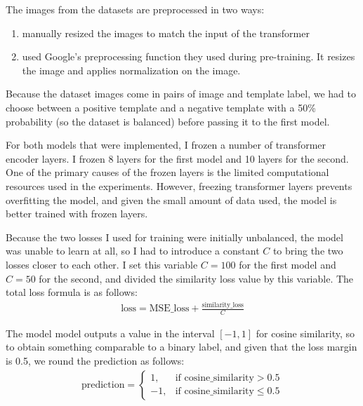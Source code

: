 \documentclass{report}[12pt, a4paper]
\begin{document}
The images from the datasets are preprocessed in two ways:
\begin{enumerate}
    \item manually resized the images to match the input of the transformer
    \item used Google's preprocessing function they used during pre-training. It resizes the image and applies normalization on the image.
\end{enumerate}
Because the dataset images come in pairs of image and template label, we had to choose between a positive template and a negative template with a 50\% probability (so the dataset is balanced) before passing it to the first model.

For both models that were implemented, I frozen a number of transformer encoder layers. I frozen 8 layers for the first model and 10 layers for the second. One of the primary causes of the frozen layers is the limited computational resources used in the experiments. However, freezing transformer layers prevents overfitting the model, and given the small amount of data used, the model is better trained with frozen layers.

Because the two losses I used for training were initially unbalanced, the model was unable to learn at all, so I had to introduce a constant $C$ to bring the two losses closer to each other. I set this variable $C=100$ for the first model and $C=50$ for the second, and divided the similarity loss value by this variable. The total loss formula is as follows:
\begin{align*}
    \text{loss} = \text{MSE\_loss} + \frac{\text{similarity\_loss}}{C}
\end{align*}


The model model outputs a value in the interval $\left[-1,1\right]$ for cosine similarity, so to obtain something comparable to a binary label, and given that the loss margin is 0.5, we round the prediction as follows:
\begin{align*}
    \text{prediction} =
        \begin{cases}
        1,  & \text{if } \text{cosine\_similarity} > 0.5 \\
        -1, & \text{if } \text{cosine\_similarity} \leq 0.5
        \end{cases}
\end{align*}
\end{document}
